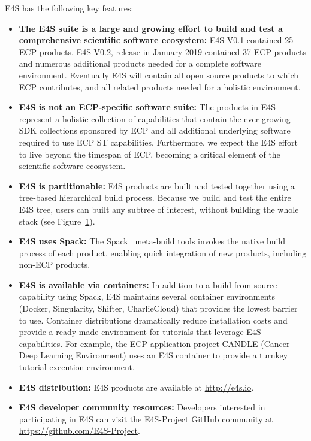 \begin{figure}
	\label{fig:e4s-build-tree}
\end{figure}

E4S has the following key features:
\begin{itemize}
	\item \textbf{The E4S suite is a large and growing effort to build and test a comprehensive scientific software ecosystem:} E4S V0.1 contained 25 ECP products.  E4S V0.2, release in January 2019 contained 37 ECP products and numerous additional products needed for a complete software environment.  Eventually E4S will contain all open source products to which ECP contributes, and all related products needed for a holistic environment.
	\item \textbf{E4S is not an ECP-specific software suite:}  The products in E4S represent a holistic collection of capabilities that contain the ever-growing SDK collections sponsored by ECP and all additional underlying software required to use ECP ST capabilities.  Furthermore, we expect the E4S effort to live beyond the timespan of ECP, becoming a critical element of the scientific software ecosystem.
	\item \textbf{E4S is partitionable:} E4S products are built and tested together using a tree-based hierarchical build process.  Because we build and test the entire E4S tree, users can built any subtree of interest, without building the whole stack (see Figure~\ref{fig:e4s-build-tree}).
	\item \textbf{E4S uses Spack:} The Spack~\cite{gamblin+:ecp18-spack-tutorial} meta-build tools invokes the native build process of each product, enabling quick integration of new products, including non-ECP products.
	\item \textbf{E4S is available via containers:} In addition to a build-from-source capability using Spack, E4S maintains several container environments (Docker, Singularity, Shifter, CharlieCloud) that provides the lowest barrier to use.  Container distributions dramatically reduce installation costs and provide a ready-made environment for tutorials that leverage E4S capabilities.  For example, the ECP  application project CANDLE (Cancer Deep Learning Environment) uses an E4S container to provide a turnkey tutorial execution environment.
	\item \textbf{E4S distribution:} E4S products are available at \url{http://e4s.io}.
	\item \textbf{E4S developer community resources:} Developers interested in participating in E4S can visit the E4S-Project GitHub community at \url{https://github.com/E4S-Project}.	
\end{itemize}

